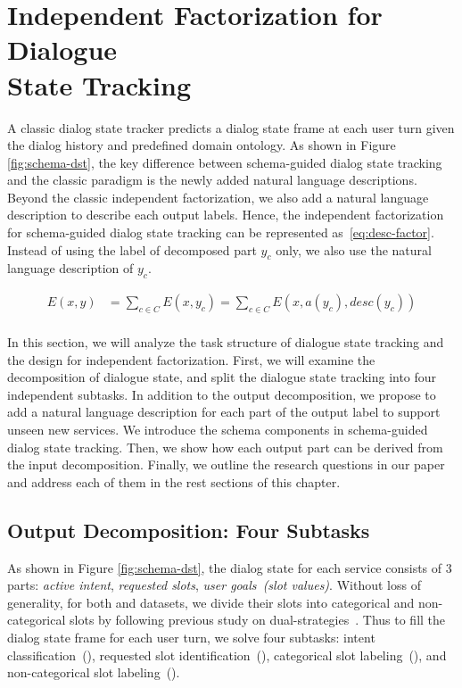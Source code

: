 
\section[Independent Factorization for Dialogue State Tracking]{Independent Factorization for Dialogue \\State Tracking}
\label{sec:sgd:ind-factorization}
A classic dialog state tracker predicts a dialog state frame at each
user turn given the dialog history and predefined domain ontology. As
shown in Figure \ref{fig:schema-dst}, the key difference between
schema-guided dialog state tracking and the classic paradigm is the
newly added natural language descriptions. Beyond the classic
independent factorization, we also add a natural language description
to describe each output labels. Hence, the independent factorization
for schema-guided dialog state tracking can be represented
as~\autoref{eq:desc-factor}. Instead of using the label of decomposed
part $y_{c}$ only, we also use the natural language description of
$y_{c}$.

\begin{equation}
    \label{eq:desc-factor}
    \begin{split}
    E(x, y) & =\sum_{c \in C} E(x, y_{c}) = \sum_{c \in C}E(x, a(y_{c}), desc(y_{c}))  \\
    \end{split}
\end{equation}



In this section, we will
analyze the task structure of dialogue state tracking and the design
for independent factorization. First, we will examine the
decomposition of dialogue state, and split the dialogue state tracking
into four independent subtasks. In addition to the output
decomposition, we propose to add a natural language description for
each part of the output label to support unseen new services. We
introduce the schema components in schema-guided dialog state
tracking. Then, we show how each output part can be derived from the
input decomposition. Finally, we outline the research questions in
our paper and address each of them in the rest sections of this
chapter.

\subsection{Output Decomposition: Four Subtasks}
\label{sec:sgd:decompose-y}
As shown in Figure \ref{fig:schema-dst}, the dialog state for each
service consists of 3 parts: {\it active intent}, {\it requested
  slots}, {\it user goals~(slot values)}. Without loss of generality,
for both \sgdst and \multiwoz datasets, we divide their slots into
categorical and non-categorical slots by following previous study on
dual-strategies~\cite{zhang2019find}. Thus to fill the dialog state
frame for each user turn, we solve four  subtasks:
intent classification~(\IC), requested slot identification~(\RSI),
categorical slot labeling~(\CSL), and non-categorical slot
labeling~(\NSL).

